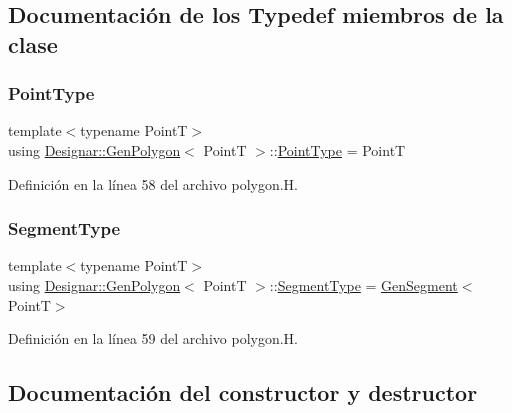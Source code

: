 \subsection{Documentación de los \textquotesingle{}Typedef\textquotesingle{} miembros de la clase}
\mbox{\label{class_designar_1_1_gen_polygon_a257735320e85cb672973f88f01625632}} 
\subsubsection{\texorpdfstring{Point\+Type}{PointType}}
{\footnotesize\ttfamily template$<$typename PointT$>$ \\
using \hyperlink{class_designar_1_1_gen_polygon}{Designar\+::\+Gen\+Polygon}$<$ PointT $>$\+::\hyperlink{class_designar_1_1_gen_polygon_a257735320e85cb672973f88f01625632}{Point\+Type} =  PointT}



Definición en la línea 58 del archivo polygon.\+H.

\mbox{\label{class_designar_1_1_gen_polygon_a06fe54118b31269c3fc76cc9b5e55654}} 
\subsubsection{\texorpdfstring{Segment\+Type}{SegmentType}}
{\footnotesize\ttfamily template$<$typename PointT$>$ \\
using \hyperlink{class_designar_1_1_gen_polygon}{Designar\+::\+Gen\+Polygon}$<$ PointT $>$\+::\hyperlink{class_designar_1_1_gen_polygon_a06fe54118b31269c3fc76cc9b5e55654}{Segment\+Type} =  \hyperlink{class_designar_1_1_gen_segment}{Gen\+Segment}$<$PointT$>$}



Definición en la línea 59 del archivo polygon.\+H.



\subsection{Documentación del constructor y destructor}
\mbox{\label{class_designar_1_1_gen_polygon_a309794dce5861b9f5c158ea48a01be3e}} 
